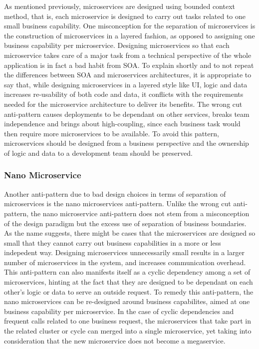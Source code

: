 \documentclass{Configuration_Files/PoliMi3i_thesis}
\begin{document}
As mentioned previously, microservices are designed using bounded context method, that is, each microservice is designed to carry out tasks related to one small business capability.
One misconception for the separation of microservices is the construction of microservices in a layered fashion, as opposed to assigning one business capability per microservice.
Designing microservices so that each microservice takes care of a major task from a technical perspective of the whole application is in fact a bad habit from SOA.
To explain shortly and to not repeat the differences between SOA and microservices architectures, it is appropriate to say that, while designing microservices in a layered style like UI, logic and data increases re-usability of both code and data, it conflicts with the requirements needed for the microservice architecture to deliver its benefits.
The wrong cut anti-pattern causes deployments to be dependant on other services, breaks team independence and brings about high-coupling, since each business task would then require more microservices to be available.
To avoid this pattern, microservices should be designed from a business perspective and the ownership of logic and data to a development team should be preserved.

\subsubsection{Nano Microservice}
\label{subsubsec:nano_microservice}

Another anti-pattern due to bad design choices in terms of separation of microservices is the nano microservices anti-pattern.
Unlike the wrong cut anti-pattern, the nano microservice anti-pattern does not stem from a misconception of the design paradigm but the excess use of separation of business boundaries.
As the name suggests, there might be cases that the microservices are designed so small that they cannot carry out business capabilities in a more or less indepedent way.
Designing microservices unnecessarily small results in a larger number of microservices in the system, and increases communication overhead.
This anti-pattern can also manifests itself as a cyclic dependency among a set of microservices, hinting at the fact that they are designed to be dependant on each other's logic or data to serve an outside request.
To remedy this anti-pattern, the nano microservices can be re-designed around business capabilites, aimed at one business capability per microservice.
In the case of cyclic dependencies and frequent calls related to one business request, the microservices that take part in the related cluster or cycle can merged into a single microservice, yet taking into consideration that the new microservice does not become a megaservice.
\end{document}

